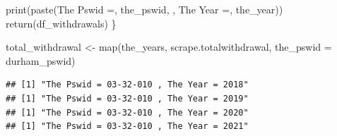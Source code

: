 \documentclass[
  12pt,
]{article}
\newenvironment{Shaded}{\begin{snugshade}}{\end{snugshade}}
\newcommand{\AttributeTok}[1]{\textcolor[rgb]{0.77,0.63,0.00}{#1}}
\newcommand{\FunctionTok}[1]{\textcolor[rgb]{0.00,0.00,0.00}{#1}}
\newcommand{\NormalTok}[1]{#1}
\newcommand{\OtherTok}[1]{\textcolor[rgb]{0.56,0.35,0.01}{#1}}
\newcommand{\SpecialCharTok}[1]{\textcolor[rgb]{0.00,0.00,0.00}{#1}}
\newcommand{\StringTok}[1]{\textcolor[rgb]{0.31,0.60,0.02}{#1}}
\begin{document}
\begin{Shaded}
\begin{Highlighting}[]
  \FunctionTok{print}\NormalTok{(}\FunctionTok{paste}\NormalTok{(}\StringTok{\textquotesingle{}The Pswid =\textquotesingle{}}\NormalTok{, the\_pswid, }\StringTok{\textquotesingle{}, The Year =\textquotesingle{}}\NormalTok{, the\_year))}
  \FunctionTok{return}\NormalTok{(df\_withdrawals)}
\NormalTok{\}}

\NormalTok{total\_withdrawal }\OtherTok{\textless{}{-}} \FunctionTok{map}\NormalTok{(the\_years, scrape.totalwithdrawal, }\AttributeTok{the\_pswid =}\NormalTok{ durham\_pswid)}
\end{Highlighting}
\end{Shaded}

\begin{verbatim}
## [1] "The Pswid = 03-32-010 , The Year = 2018"
## [1] "The Pswid = 03-32-010 , The Year = 2019"
## [1] "The Pswid = 03-32-010 , The Year = 2020"
## [1] "The Pswid = 03-32-010 , The Year = 2021"
\end{verbatim}

\begin{Shaded}
\end{Shaded}
\end{document}
